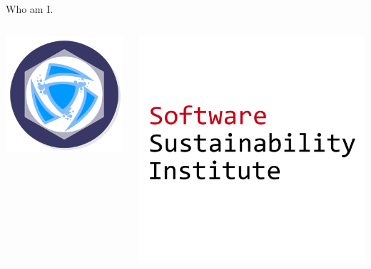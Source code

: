 \documentclass{beamer}
\begin{document}
\begin{frame}{Who am I.}
\begin{columns}[T]
\begin{column}{.2\textwidth}
  		\includegraphics[width=\textwidth]{static/hots_logo.jpg}
\end{column}%
\begin{column}{.2\textwidth}
  		\includegraphics[width=\textwidth]{static/ssi-logo.png}


\end{column}
\end{columns}
\end{frame}
\end{document}
